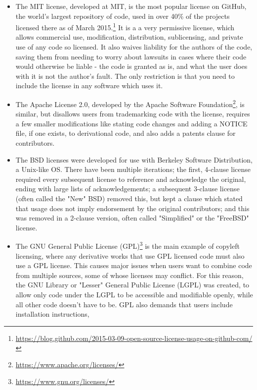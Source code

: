 \begin{itemize}
\item The MIT license, developed at MIT, is the most popular license on GitHub, the world's largest repository of code, used in over 40\% of the projects licensed there as of March 2015.\footnote{\href{https://blog.github.com/2015-03-09-open-source-license-usage-on-github-com/}{https://blog.github.com/2015-03-09-open-source-license-usage-on-github-com/}} It is a a very permissive license, which allows commercial use, modification, distribution, sublicensing, and private use of any code so licensed. It also waives liability for the authors of the code, saving them from needing to worry about lawsuits in cases where their code would otherwise be liable - the code is granted as is, and what the user does with it is not the author's fault. The only restriction is that you need to include the license in any software which uses it.
\item The Apache License 2.0, developed by the Apache Software Foundation\footnote{\href{https://www.apache.org/licenses/}{https://www.apache.org/licenses/}}, is similar, but disallows users from trademarking code with the license, requires a few smaller modifications like stating code changes and adding a NOTICE file, if one exists, to derivational code, and also adds a patents clause for contributors.
\item The BSD licenses were developed for use with Berkeley Software Distribution, a Unix-like OS. There have been multiple iterations; the first, 4-clause license required every subsequent license to reference and acknowledge the original, ending with large lists of acknowledgements; a subsequent 3-clause license (often called the "New" BSD) removed this, but kept a clause which stated that usage does not imply endorsement by the original contributors; and this was removed in a 2-clause version, often called "Simplified" or the "FreeBSD" license.
\item The GNU General Public License (GPL)\footnote{\href{https://www.gnu.org/licenses/}{https://www.gnu.org/licenses/}} is the main example of copyleft licensing, where any derivative works that use GPL licensed code must also use a GPL license. This causes major issues when users want to combine code from multiple sources, some of whose licenses may conflict. For this reason, the GNU Library or "Lesser" General Public License (LGPL) was created, to allow only code under the LGPL to be accessible and modifiable openly, while all other code doesn't have to be. GPL also demands that users include installation instructions,

\end{itemize}
